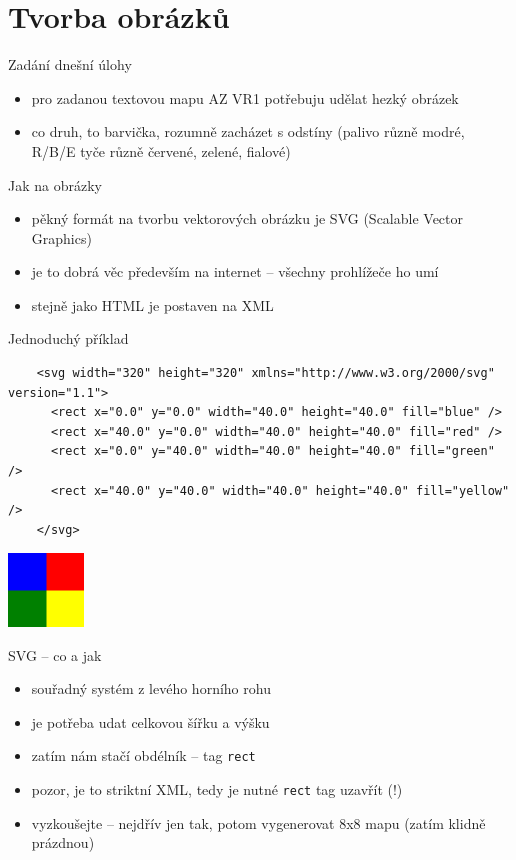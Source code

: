 \documentclass{beamer}
\begin{document}
\section{Tvorba obrázků}

\begin{frame}{Zadání dnešní úlohy}
  \begin{itemize}
    \item pro zadanou textovou mapu AZ VR1 potřebuju udělat hezký obrázek
    \item co druh, to barvička, rozumně zacházet s odstíny (palivo různě modré, R/B/E tyče různě červené, zelené, fialové)
  \end{itemize}
\end{frame}

\begin{frame}{Jak na obrázky}
  \begin{itemize}
    \item pěkný formát na tvorbu vektorových obrázku je SVG (Scalable Vector Graphics)
    \item je to dobrá věc především na internet -- všechny prohlížeče ho umí
    \item stejně jako HTML je postaven na XML
  \end{itemize}
\end{frame}

\begin{frame}[fragile]{Jednoduchý příklad}
  \tiny
  \begin{verbatim}
    <svg width="320" height="320" xmlns="http://www.w3.org/2000/svg" version="1.1">
      <rect x="0.0" y="0.0" width="40.0" height="40.0" fill="blue" />
      <rect x="40.0" y="0.0" width="40.0" height="40.0" fill="red" />
      <rect x="0.0" y="40.0" width="40.0" height="40.0" fill="green" />
      <rect x="40.0" y="40.0" width="40.0" height="40.0" fill="yellow" />
    </svg>
  \end{verbatim}
  \includegraphics[width=0.15\textwidth]{example}
\end{frame}

\begin{frame}{SVG -- co a jak}
  \begin{itemize}
    \item souřadný systém z levého horního rohu
    \item je potřeba udat celkovou šířku a výšku
    \item zatím nám stačí obdélník -- tag \texttt{rect}
    \item pozor, je to striktní XML, tedy je nutné \texttt{rect} tag uzavřít (!)
    \item vyzkoušejte -- nejdřív jen tak, potom vygenerovat 8x8 mapu (zatím klidně prázdnou)
  \end{itemize}
\end{frame}
\end{document}
